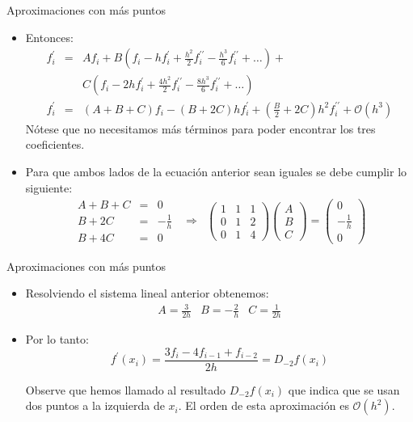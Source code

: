 \documentclass{beamer}
\begin{document}
\begin{frame}{Aproximaciones con más puntos}
\begin{itemize}
	\item Entonces:
\begin{eqnarray*}
f^\prime_i & = &  A f_i + 
 B \left(f_i -h f^\prime_i + \frac{h^2}{2} f^{\prime\prime}_i - 
 \frac{h^3}{6} f^{\prime\prime}_i + \dots \right) + \\
 & & C \left(f_i -2h f^\prime_i + \frac{4 h^2}{2} f^{\prime\prime}_i -
 \frac{8 h^3}{6} f^{\prime\prime}_i + \dots \right) \\
f^\prime_i & = &  (A + B + C) f_{i} - (B + 2C) h f^\prime_i + \left(\frac{B}{2} + 2C\right) h^2 f^{\prime\prime}_i + \mathcal{O}(h^3)
\end{eqnarray*}
Nótese que no necesitamos más términos para poder encontrar los tres coeficientes.
\item Para que ambos lados de la ecuación anterior sean iguales se debe cumplir lo siguiente:
\[
\begin{array}{ccc}
\begin{array}{rcc}
A + B + C & = & 0 \\
B + 2C & = & -\frac{1}{h} \\
B + 4C & = & 0 
\end{array} 
& \Longrightarrow &
\left(
\begin{array}{ccc}
1 & 1 & 1 \\
0 & 1 & 2 \\
0 & 1 & 4
\end{array}
\right)
\left(
\begin{array}{c}
A \\ B \\ C 
\end{array}
\right) = 
\left(
\begin{array}{c}
0 \\ -\frac{1}{h} \\ 0 
\end{array}
\right)

\end{array}
\]
\end{itemize}
\end{frame}

\begin{frame}{Aproximaciones con más puntos}

\begin{itemize}
	\item Resolviendo el sistema lineal anterior obtenemos:
\[
\begin{array}{ccc}
A = \frac{3}{2h} & B = -\frac{2}{h} & C = \frac{1}{2h}
\end{array}
\]
	\item Por lo tanto:
\[
\boxed{f^\prime(x_i) = \frac{3 f_i - 4 f_{i-1} + f_{i-2}}{2h} = D_{-2} f(x_i)}
\]

Observe que hemos llamado al resultado $D_{-2}f(x_i)$ que indica que se usan dos puntos a la izquierda de $x_i$.
El orden de esta aproximación es $\mathcal{O}(h^2)$. 
\end{itemize}

\end{frame}
\end{document}
